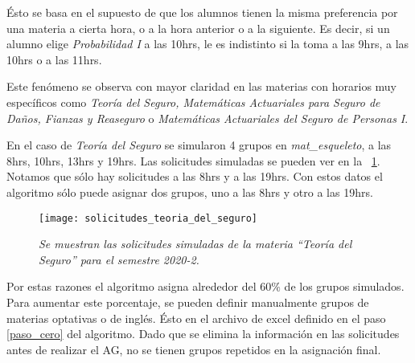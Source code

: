 Ésto se basa en el supuesto de que los alumnos tienen la misma preferencia por una materia a cierta hora, o a la hora anterior o a la siguiente. Es decir, si un alumno elige \textit{Probabilidad I} a las 10hrs, le es indistinto si la toma a las 9hrs, a las 10hrs o a las 11hrs.

Este fenómeno se observa con mayor claridad en las materias con horarios muy específicos como \textit{Teoría del Seguro, Matemáticas Actuariales para Seguro de Daños, Fianzas y Reaseguro} o \textit{Matemáticas Actuariales del Seguro de Personas I}.

En el caso de \textit{Teoría del Seguro} se simularon 4 grupos en \textit{mat\_esqueleto}, a las 8hrs, 10hrs, 13hrs y 19hrs. Las solicitudes simuladas se pueden ver en la \figurename{~\ref{sol_TeoSeguro}}. Notamos que sólo hay solicitudes a las 8hrs y a las 19hrs. Con estos datos el algoritmo sólo puede asignar dos grupos, uno a las 8hrs y otro a las 19hrs.

\begin{figure}[H]
\centering
\texttt{[image: solicitudes\_teoria\_del\_seguro]} %
\caption[\textit{Solicitudes simuladas de la materia ``Teoría del Seguro'' para el semestre 2020-2}]{\textit{Se muestran las solicitudes simuladas de la materia ``Teoría del Seguro'' para el semestre 2020-2.}}\label{sol_TeoSeguro}
\end{figure}

Por estas razones el algoritmo asigna alrededor del $60\%$ de los grupos simulados. Para aumentar este porcentaje, se pueden definir manualmente grupos de materias optativas o de inglés. Ésto en el archivo de excel definido en el paso \ref{paso_cero} del algoritmo. Dado que se elimina la información en las solicitudes antes de realizar el AG, no se tienen grupos repetidos en la asignación final.

